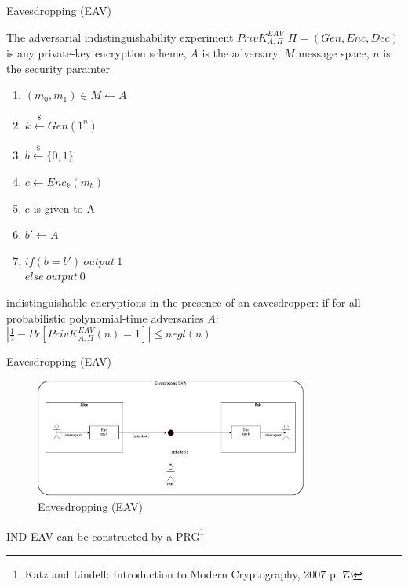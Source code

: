 \documentclass[ucs,9pt]{beamer}
\begin{document}
\begin{frame}{Eavesdropping (EAV)}
    \begin{block}{The adversarial indistinguishability experiment $PrivK_{A,\Pi}^{EAV}$}
        $\Pi = (Gen, Enc, Dec)$ is any private-key encryption scheme, $A$ is the adversary, $M$ message space, $n$ is the security paramter\\
        
        \begin{enumerate}
            \item $(m_0,m_1) \in M \leftarrow A$
            \item $k \overset{\$}{\leftarrow} Gen(1^n)$
            \item $b \overset{\$}{\leftarrow} \{0,1\}$
            \item $c \leftarrow Enc_{k}(m_b)$
            \item c is given to A
            \item $b' \leftarrow A$
                \item $if(b = b')\ output\ 1$ \\
                $else\ output\ 0$
        \end{enumerate}
        
        indistinguishable encryptions in the presence of an eavesdropper: if for all probabilistic polynomial-time adversaries $A$:\\
        $\left | \frac{1}{2} - Pr[PrivK_{A,\Pi}^{EAV}(n) = 1] \right | \leq negl(n)$
    \end{block}
\end{frame}

\begin{frame}{Eavesdropping (EAV)}
    
    \begin{figure}[h]
        \centering
        \includegraphics[width=0.8\textwidth]{figures/EAV.png}
        \caption{Eavesdropping (EAV)}
    \end{figure}
    IND-EAV can be constructed by a PRG\footnote{Katz and Lindell: Introduction to Modern Cryptography, 2007 p. 73}
\end{frame}
\end{document}
